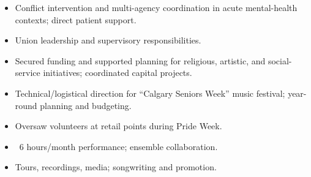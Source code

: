 \begin{itemize}
  \item Conflict intervention and multi-agency coordination in acute mental-health contexts; direct patient support.
  \item Union leadership and supervisory responsibilities.
\end{itemize}

\begin{itemize}
  \item Secured funding and supported planning for religious, artistic, and social-service initiatives; coordinated capital projects.
\end{itemize}

\begin{itemize}
  \item Technical/logistical direction for “Calgary Seniors Week” music festival; year-round planning and budgeting.
\end{itemize}

\begin{itemize}
  \item Oversaw volunteers at retail points during Pride Week.
\end{itemize}

\begin{itemize}
  \item ~6 hours/month performance; ensemble collaboration.
\end{itemize}

\begin{itemize}
  \item Tours, recordings, media; songwriting and promotion.
\end{itemize}
